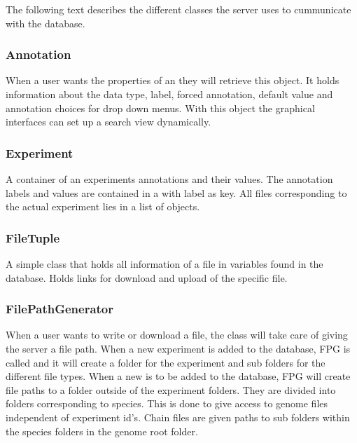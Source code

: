 The following text describes the different classes the server uses to cummunicate with the database.

\subsubsection{Annotation}
When a user wants the properties of an  they will retrieve this object. It holds information about the data type, label, forced annotation, default value and annotation choices for drop down menus. With this object the graphical interfaces can set up a search view dynamically.

\subsubsection{Experiment}
A container of an experiments annotations and their values. The annotation labels and values are contained in a  with label as key. All files corresponding to the actual experiment lies in a list of  objects.

\subsubsection{FileTuple}
A simple class that holds all information of a file in variables found in the database. Holds links for download and upload of the specific file.

\subsubsection{FilePathGenerator}
When a user wants to write or download a file, the  class will take care of giving the server a file path. When a new experiment is added to the database, FPG is called and it will create a folder for the experiment and sub folders for the different file types. When a new  is to be added to the database, FPG will create file paths to a folder outside of the experiment folders. They are divided into folders corresponding to species.  This is done to give access to genome files independent of experiment id's. Chain files are given paths to sub folders within the species folders in the genome root folder.

